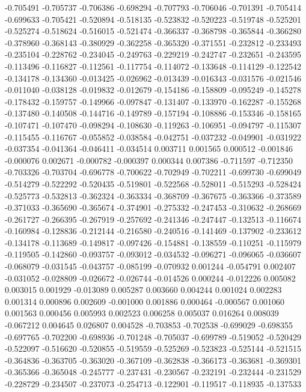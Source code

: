 -0.705491
-0.705737
-0.706386
-0.698294
-0.707793
-0.706046
-0.701391
-0.705414
-0.699633
-0.705421
-0.520894
-0.518135
-0.523832
-0.520223
-0.519748
-0.525201
-0.525274
-0.518624
-0.516015
-0.521474
-0.366337
-0.368798
-0.365844
-0.366280
-0.378960
-0.368143
-0.380929
-0.362258
-0.365320
-0.371551
-0.232812
-0.233493
-0.235104
-0.228762
-0.234045
-0.249763
-0.229219
-0.242747
-0.232651
-0.243595
-0.113496
-0.116827
-0.112561
-0.117754
-0.114072
-0.133648
-0.114129
-0.122542
-0.134178
-0.134360
-0.013425
-0.026962
-0.013439
-0.016343
-0.031576
-0.021546
-0.011040
-0.038128
-0.019832
-0.012679
-0.154186
-0.158809
-0.095249
-0.145278
-0.178432
-0.159757
-0.149966
-0.097847
-0.131407
-0.133970
-0.162287
-0.155268
-0.137480
-0.140508
-0.144716
-0.149789
-0.157194
-0.108886
-0.153346
-0.158165
-0.107471
-0.107470
-0.098294
-0.108630
-0.119263
-0.106951
-0.094797
-0.115307
-0.115455
-0.116767
-0.055852
-0.038584
-0.042751
-0.037232
-0.049901
-0.031922
-0.037354
-0.041364
-0.046411
-0.034514
0.003711
0.001565
0.000512
-0.001846
-0.000076
0.002671
-0.000782
-0.000397
0.000344
0.007386
-0.711597
-0.712350
-0.703326
-0.703704
-0.696778
-0.700622
-0.702949
-0.702211
-0.699730
-0.699049
-0.514279
-0.522292
-0.520435
-0.519801
-0.522568
-0.528011
-0.515293
-0.528424
-0.525773
-0.532813
-0.362324
-0.363334
-0.368709
-0.367675
-0.363366
-0.373589
-0.371033
-0.365690
-0.365674
-0.374901
-0.275332
-0.247453
-0.310632
-0.268669
-0.261727
-0.266395
-0.267919
-0.257692
-0.241346
-0.247447
-0.132513
-0.116674
-0.160984
-0.128836
-0.212144
-0.216580
-0.240516
-0.141469
-0.137902
-0.233612
-0.134178
-0.113689
-0.149817
-0.097426
-0.154881
-0.138559
-0.110251
-0.115979
-0.119505
-0.142860
-0.093757
-0.093012
-0.034532
-0.096271
-0.096065
-0.036607
-0.068079
-0.031545
-0.043757
-0.085199
-0.070932
0.001244
-0.054791
0.002407
-0.031052
-0.028809
-0.026672
-0.026744
-0.014526
0.000244
-0.012226
0.005082
0.003015
0.001929
-0.013089
0.005287
0.003660
0.004244
0.001024
0.002283
0.001314
0.000896
0.002609
-0.001000
0.001886
0.000464
-0.000567
0.001060
0.001563
0.000456
0.005993
0.002523
0.006258
0.005037
0.016264
0.008039
-0.067212
0.004645
0.026807
0.004528
-0.703853
-0.702538
-0.699029
-0.698355
-0.697765
-0.702200
-0.698936
-0.701248
-0.705037
-0.699789
-0.519052
-0.520429
-0.522097
-0.516620
-0.520855
-0.519559
-0.525269
-0.523823
-0.525144
-0.521515
-0.364836
-0.363705
-0.363020
-0.367109
-0.362838
-0.366173
-0.363681
-0.369301
-0.365366
-0.365048
-0.245777
-0.237431
-0.230567
-0.232191
-0.232444
-0.231529
-0.228729
-0.234507
-0.237073
-0.254713
-0.122901
-0.119517
-0.118935
-0.137533

